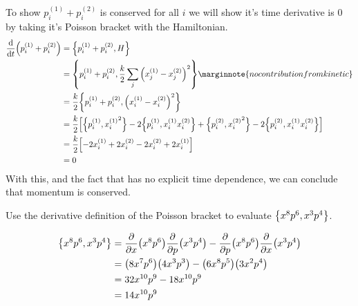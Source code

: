 \documentclass[boxes]{homework}
\makeatletter
\newcommand{\mmtm}[2]{p_#1^{(#2)}}
\newcommand{\pstn}[2]{x_#1^{(#2)}}
\numberwithin{@problem}{section}
\makeatother
\begin{document}
\begin{solution}
	To show $\mmtm{i}{1} + \mmtm{i}{2}$ is conserved for all $i$ we will show it's time derivative is 0 by taking it's Poisson bracket with the Hamiltonian.
	\begin{align*}
		\dv{t}\qty(\mmtm{i}{1} + \mmtm{i}{2}) & = \pb{\mmtm{i}{1} + \mmtm{i}{2}}{H}                                                                                                                                              \\
		                                      & = \pb{\mmtm{i}{1} + \mmtm{i}{2}}{\frac{k}{2}\sum_j\qty(\pstn{j}{1} - \pstn{j}{2})^2} \marginnote{no contribution from kinetic}                                                   \\
		                                      & = \frac{k}{2}\pb{\mmtm{i}{1} + \mmtm{i}{2}}{\qty(\pstn{i}{1} - \pstn{i}{2})^2}                                                                                                   \\
		                                      & = \frac{k}{2}\qty[\pb{\mmtm{i}{1}}{{\pstn{i}{1}}^2} - 2\pb{\mmtm{i}{1}}{\pstn{i}{1}\pstn{i}{2}} + \pb{\mmtm{i}{2}}{{\pstn{i}{2}}^2} - 2\pb{\mmtm{i}{2}}{\pstn{i}{1}\pstn{i}{2}}] \\
		                                      & = \frac{k}{2}\qty[-2\pstn{i}{1} + 2\pstn{i}{2} - 2\pstn{i}{2} + 2\pstn{i}{1}]                                                                                                    \\
		                                      & = 0
	\end{align*}
	With this, and the fact that has no explicit time dependence, we can conclude that momentum is conserved.
\end{solution}

\begin{problem}
Use the derivative definition of the Poisson bracket to evaluate $\pb{x^8p^6}{x^3p^4}$.
\end{problem}

\begin{solution}
	\begin{align*}
		\pb{x^8p^6}{x^3p^4} & = \pdv{x}\qty(x^8p^6)\pdv{p}\qty(x^3p^4) - \pdv{p}\qty(x^8p^6)\pdv{x}\qty(x^3p^4) \\
		                    & = \qty(8x^7p^6)\qty(4x^3p^3) - \qty(6x^8p^5)\qty(3x^2p^4)                         \\
		                    & = 32x^{10}p^9 - 18x^{10}p^9                                                       \\
		                    & = 14x^{10}p^9
	\end{align*}
\end{solution}
\end{document}
